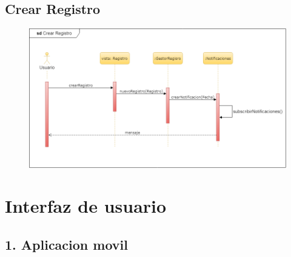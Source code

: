 		\subsection{Crear Registro}
			\begin{figure}[H]
        \centering
        \includegraphics[width=1\textwidth]{imagenes/DiagramasUML/sdCrearRegistro.png}
					\label{fig:diagrama-secuencia-crear-tienda}
			\end{figure}


	\section{Interfaz de usuario}
			\subsection{1. Aplicacion movil}

